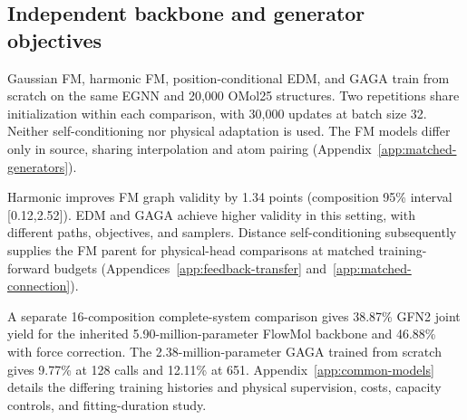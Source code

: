 \subsection{Independent backbone and generator objectives}\label{sec:matched-generators}
Gaussian FM, harmonic FM, position-conditional EDM, and GAGA \citep{edm,qu2026gaga} train from scratch on the same EGNN and 20,000 OMol25 structures. Two repetitions share initialization within each comparison, with 30,000 updates at batch size 32. Neither self-conditioning nor physical adaptation is used. The FM models differ only in source, sharing interpolation and atom pairing (Appendix~\ref{app:matched-generators}).

Harmonic improves FM graph validity by 1.34 points (composition 95\% interval [0.12,2.52]). EDM and GAGA achieve higher validity in this setting, with different paths, objectives, and samplers. Distance self-conditioning subsequently supplies the FM parent for physical-head comparisons at matched training-forward budgets (Appendices~\ref{app:feedback-transfer} and~\ref{app:matched-connection}).

A separate 16-composition complete-system comparison gives 38.87\% GFN2 joint yield for the inherited 5.90-million-parameter FlowMol backbone and 46.88\% with force correction. The 2.38-million-parameter GAGA trained from scratch gives 9.77\% at 128 calls and 12.11\% at 651. Appendix~\ref{app:common-models} details the differing training histories and physical supervision, costs, capacity controls, and fitting-duration study.
